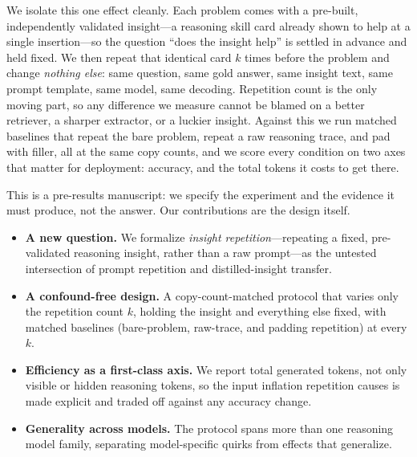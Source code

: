 We isolate this one effect cleanly. Each problem comes with a pre-built, independently
validated insight---a reasoning skill card already shown to help at a single
insertion---so the question ``does the insight help'' is settled in advance and held
fixed. We then repeat that identical card $k$ times before the problem and change
\emph{nothing else}: same question, same gold answer, same insight text, same prompt
template, same model, same decoding. Repetition count is the only moving part, so any
difference we measure cannot be blamed on a better retriever, a sharper extractor, or
a luckier insight. Against this we run matched baselines that repeat the bare problem,
repeat a raw reasoning trace, and pad with filler, all at the same copy counts, and we
score every condition on two axes that matter for deployment: accuracy, and the total
tokens it costs to get there.

This is a pre-results manuscript: we specify the experiment and the evidence it must
produce, not the answer. Our contributions are the design itself.

\begin{itemize}
  \item \textbf{A new question.} We formalize \emph{insight repetition}---repeating a
        fixed, pre-validated reasoning insight, rather than a raw prompt---as the
        untested intersection of prompt repetition and distilled-insight transfer.
  \item \textbf{A confound-free design.} A copy-count-matched protocol that varies only
        the repetition count $k$, holding the insight and everything else fixed, with
        matched baselines (bare-problem, raw-trace, and padding repetition) at every
        $k$.
  \item \textbf{Efficiency as a first-class axis.} We report total generated tokens,
        not only visible or hidden reasoning tokens, so the input inflation repetition
        causes is made explicit and traded off against any accuracy change.
  \item \textbf{Generality across models.} The protocol spans more than one reasoning
        model family, separating model-specific quirks from effects that generalize.
\end{itemize}
